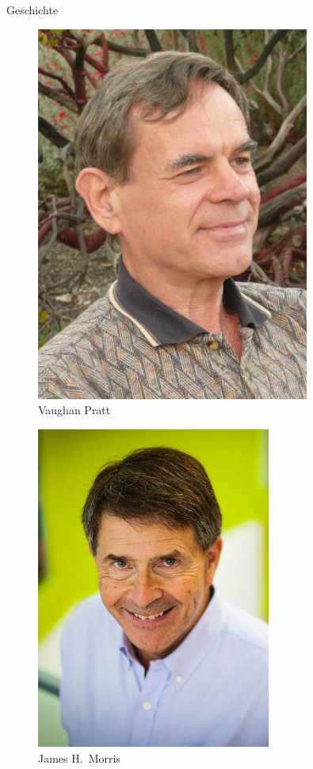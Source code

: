 \documentclass[xcolor=dvipsnames, aspectratio=1610]{beamer}
\begin{document}
\begin{frame}{Geschichte}
\begin{minipage}{0.3\textwidth}
\begin{figure}
\includegraphics[width=0.8\textwidth]{pratt}
\caption{Vaughan Pratt}
\end{figure}
\end{minipage}
\hfill
\begin{minipage}{0.3\textwidth}
\begin{figure}
\includegraphics[width=.8\textwidth]{morris}
\caption{James H.\ Morris}
\end{figure}
\end{minipage}
\end{frame}
\end{document}
